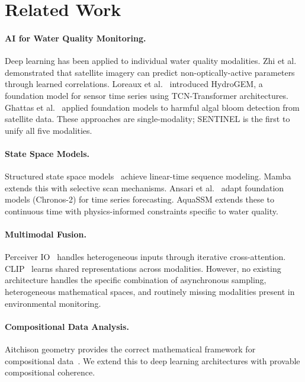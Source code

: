 \section{Related Work}
\label{sec:related_work}

\paragraph{AI for Water Quality Monitoring.}
Deep learning has been applied to individual water quality modalities.
Zhi et al.~\citep{Zhi2024} demonstrated that satellite imagery can predict
non-optically-active parameters through learned correlations.
Loreaux et al.~\citep{Loreaux2025} introduced HydroGEM, a foundation model
for sensor time series using TCN-Transformer architectures.
Ghattas et al.~\citep{Ghattas2024} applied foundation models to harmful
algal bloom detection from satellite data. These approaches are
single-modality; SENTINEL is the first to unify all five modalities.

\paragraph{State Space Models.}
Structured state space models~\citep{Gu2024} achieve linear-time sequence
modeling. Mamba extends this with selective scan mechanisms.
Ansari et al.~\citep{Ansari2025} adapt foundation models (Chronos-2) for
time series forecasting. AquaSSM extends these to continuous time with
physics-informed constraints specific to water quality.

\paragraph{Multimodal Fusion.}
Perceiver IO~\citep{Jaegle2021} handles heterogeneous inputs through
iterative cross-attention. CLIP~\citep{Radford2021} learns shared
representations across modalities. However, no existing architecture
handles the specific combination of asynchronous sampling, heterogeneous
mathematical spaces, and routinely missing modalities present in
environmental monitoring.

\paragraph{Compositional Data Analysis.}
Aitchison geometry provides the correct mathematical framework for
compositional data~\citep{GordonRodriguez2022}. We extend this to
deep learning architectures with provable compositional coherence.

